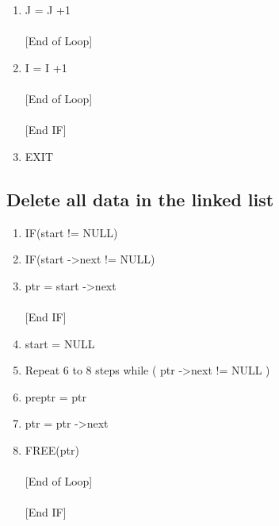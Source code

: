 \documentclass[a4paper,12pt]{article}
\begin{document}
\begin{enumerate}[Step 1:]
     \hspace*{36mm}         temp = arr[I]\\
     \hspace*{36mm}          arr[I] = arr[J+I]\\
     \hspace*{36mm}          arr[J+I] = temp\\
    \\ \hspace*{25mm} [End IF]
    \item \hspace*{25mm} J = J +1\\
    \\ \hspace*{15mm} [End of Loop]
    \item \hspace*{15mm} I = I +1\\
    \\ \hspace*{5mm} [End of Loop]\\
    \\\hspace*{0mm} [End IF]
    \item EXIT

\end{enumerate}

\newpage


\subsection*{Delete all data in the linked list}

\begin{enumerate}[Step 1:]

\item IF(start != NULL)

\item \hspace*{5mm} IF(start -\textgreater  next  != NULL)
\item  \hspace*{15mm} ptr = start -\textgreater  next\\
\\ \hspace*{6mm}   [End IF]
\item  \hspace*{5mm} start = NULL
\item  \hspace*{5mm}Repeat 6 to 8 steps  while ( ptr -\textgreater  next != NULL )
\item \hspace*{15mm} preptr = ptr
\item  \hspace*{15mm} ptr = ptr -\textgreater  next
\item  \hspace*{15mm} FREE(ptr)\\
\\ \hspace*{5mm} [End of Loop]\\
\\ \hspace*{1mm} [End IF]

\end{enumerate}
\end{document}
